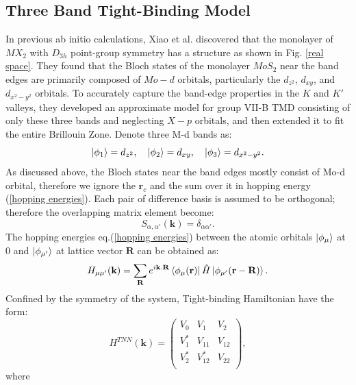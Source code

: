\documentclass[12pt,english,a4paper]{article}
\begin{document}
	\subsection{Three Band Tight-Binding Model}
\quad In previous ab initio calculations\cite{xiao_coupled_2012,mattheiss_band_1973,lebegue_electronic_2009,zhu_giant_2011,ataca_stable_2012}, Xiao et al. discovered that the monolayer of $MX_2$ with $D_{3h}$ point-group symmetry has a structure as shown in Fig. \ref{real space}. They found that the Bloch states of the monolayer $MoS_2$ near the band edges are primarily composed of $Mo-d$ orbitals, particularly the $d_{z^2}$, $d_{xy}$, and $d_{x^2-y^2}$ orbitals. To accurately capture the band-edge properties in the $K$ and $K'$ valleys, they developed an approximate model for group VII-B TMD consisting of only these three bands and neglecting $X-p$ orbitals, and then extended it to fit the entire Brillouin Zone\cite{liu_three-band_2013}. Denote three M-d bands as:
	\begin{equation}
		\ket{\phi_{1}} = d_{z^2},\quad \ket{\phi_2} = d_{xy}, \quad \ket{\phi_3} = d_{x^2- y^2}.
	\end{equation}
\quad As discussed above, the Bloch states near the band edges mostly consist of Mo-d orbital, therefore we ignore the $\textbf{r}_c$ and the sum over it in hopping energy (\ref{hopping energies}). Each pair of difference basis is assumed to be orthogonal; therefore the overlapping matrix element become:
$$S_{\alpha, \alpha'}(\textbf{k}) = \delta_{\alpha \alpha'}.$$
\quad The hopping energies eq.(\ref{hopping energies}) between the atomic orbitals $\ket{\phi_{\mu}}$ at 0 and $\ket{\phi_{\mu'}}$ at lattice vector $\textbf{R}$ can be obtained as: $$H_{\mu \mu'}(\textbf{k}) =\sum_{\textbf{R}} e^{i\textbf{k}.\textbf{R}}  \bra{\phi_{\mu}(\textbf{r})}  \hat{H} \ket{\phi_{\mu'}(\textbf{r}-\textbf{R})}.$$
\quad Confined by the symmetry of the system, Tight-binding Hamiltonian have the form:
	\begin{equation}
		H^{TNN}(\textbf{k}) =
		\begin{pmatrix}
			V_0  & V_1   & V_2 \\
			V_1^*& V_{11}& V_{12} \\
			V_2^*& V_{12}^* & V_{22} \\
		\end{pmatrix},
	\end{equation}
where
\end{document}
